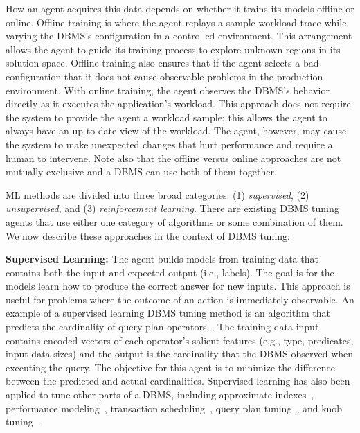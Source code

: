 \documentclass[11pt,times]{article}
\begin{document}
How an agent acquires this data depends on whether it trains its models offline or 
online. Offline training is where the agent replays a sample workload trace while varying the 
DBMS's configuration in a controlled environment.  This arrangement allows the agent to guide its 
training process to explore unknown regions in its solution space. Offline training also ensures 
that if the agent selects a bad configuration that it does not cause observable problems in the 
production environment.
With online training, the agent observes the DBMS's behavior directly as it executes the 
application's workload. This approach does not require the system to provide the agent a workload 
sample; this allows the agent to always have an up-to-date view of the workload. The agent, however, 
may cause the system to make unexpected changes that hurt performance and require a 
human to intervene. Note also that the offline versus online approaches are not mutually 
exclusive and a DBMS can use both of them together.

ML methods are divided into three broad categories: (1) \textit{supervised}, (2) 
\textit{unsupervised}, and (3) \textit{reinforcement learning}. There are existing DBMS tuning 
agents that use either one category of 
algorithms or some combination of them. We now describe these approaches in the context of DBMS 
tuning:
\\ \vspace{-0.1in}

\textbf{Supervised Learning:}
The agent builds models from training data that contains both the 
input and expected output (i.e., labels). The goal is for the models learn how to produce the 
correct answer for new inputs. This approach is useful for problems where the outcome of 
an action is immediately observable.
An example of a supervised learning DBMS tuning method is an algorithm that predicts the 
cardinality of query plan operators~\cite{ivanov17,liu15,woltmann19,kipf19}. The training data 
input contains encoded vectors of each operator's salient features (e.g., type, 
predicates, input data sizes) and the output is the cardinality that the DBMS observed when 
executing the query. The objective for this agent is to minimize the difference between the 
predicted and actual cardinalities.
Supervised learning has also been applied to tune other parts of a DBMS, including 
approximate indexes~\cite{kraska18}, performance modeling~\cite{ganapathi09,marcus19-perf}, 
transaction scheduling~\cite{pavlo11,sheng19}, query plan tuning~\cite{zhang19-ai}, and knob 
tuning~\cite{vanaken17}.
\\ \vspace{-0.1in}
\end{document}
